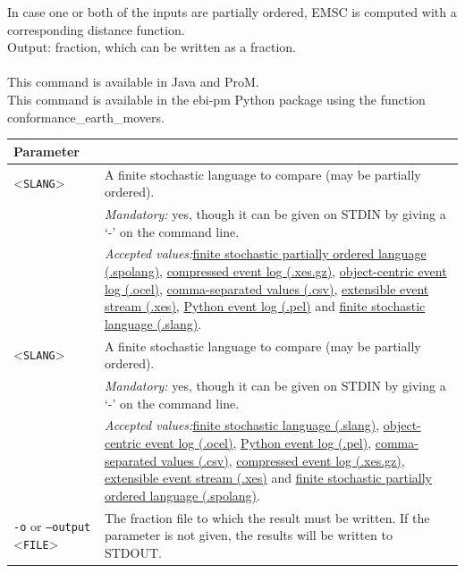 {        In case one or both of the inputs are partially ordered, EMSC is computed with a corresponding distance function.~\\
\noindent Output: fraction, which can be written as a fraction.\\
\\This command is available in Java and ProM.
\\This command is available in the ebi-pm Python package using the function conformance\_earth\_movers.
\begin{tabularx}{\linewidth}{lX}
\toprule
Parameter \\\midrule
<\texttt{SLANG}>&A finite stochastic language to compare (may be partially ordered).\\
&\textit{Mandatory:} \quad yes, though it can be given on STDIN by giving a `-' on the command line.\\
&\textit{Accepted values:}\quad \hyperref[filehandler:finite stochastic partially ordered language]{finite stochastic partially ordered language (.spolang)}, \hyperref[filehandler:compressed event log]{compressed event log (.xes.gz)}, \hyperref[filehandler:object-centric event log]{object-centric event log (.ocel)}, \hyperref[filehandler:comma-separated values]{comma-separated values (.csv)}, \hyperref[filehandler:extensible event stream]{extensible event stream (.xes)}, \hyperref[filehandler:Python event log]{Python event log (.pel)} and \hyperref[filehandler:finite stochastic language]{finite stochastic language (.slang)}.\\
<\texttt{SLANG}>&A finite stochastic language to compare (may be partially ordered).\\
&\textit{Mandatory:} \quad yes, though it can be given on STDIN by giving a `-' on the command line.\\
&\textit{Accepted values:}\quad \hyperref[filehandler:finite stochastic language]{finite stochastic language (.slang)}, \hyperref[filehandler:object-centric event log]{object-centric event log (.ocel)}, \hyperref[filehandler:Python event log]{Python event log (.pel)}, \hyperref[filehandler:comma-separated values]{comma-separated values (.csv)}, \hyperref[filehandler:compressed event log]{compressed event log (.xes.gz)}, \hyperref[filehandler:extensible event stream]{extensible event stream (.xes)} and \hyperref[filehandler:finite stochastic partially ordered language]{finite stochastic partially ordered language (.spolang)}.\\
\texttt{-o} or \texttt{--output} <\texttt{FILE}> &
The fraction file to which the result must be written. If the parameter is not given, the results will be written to STDOUT.\\

\end{tabularx}}
